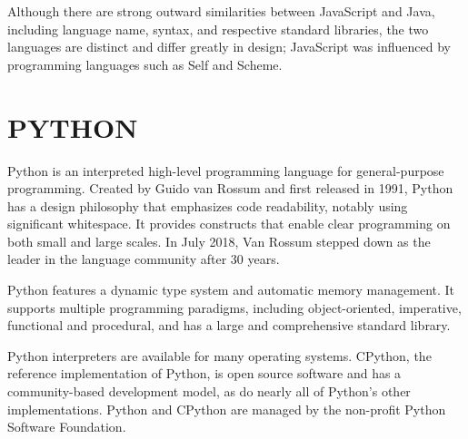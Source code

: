 Although there are strong outward similarities between JavaScript and Java, including language name, syntax, and respective standard libraries, the two languages are distinct and differ greatly in design; JavaScript was influenced by programming languages such as Self and Scheme.

\section{PYTHON}
Python is an interpreted high-level programming language for general-purpose programming. Created by Guido van Rossum and first released in 1991, Python has a design philosophy that emphasizes code readability, notably using significant whitespace. It provides constructs that enable clear programming on both small and large scales. In July 2018, Van Rossum stepped down as the leader in the language community after 30 years.

Python features a dynamic type system and automatic memory management. It supports multiple programming paradigms, including object-oriented, imperative, functional and procedural, and has a large and comprehensive standard library.

Python interpreters are available for many operating systems. CPython, the reference implementation of Python, is open source software and has a community-based development model, as do nearly all of Python's other implementations. Python and CPython are managed by the non-profit Python Software Foundation. 


